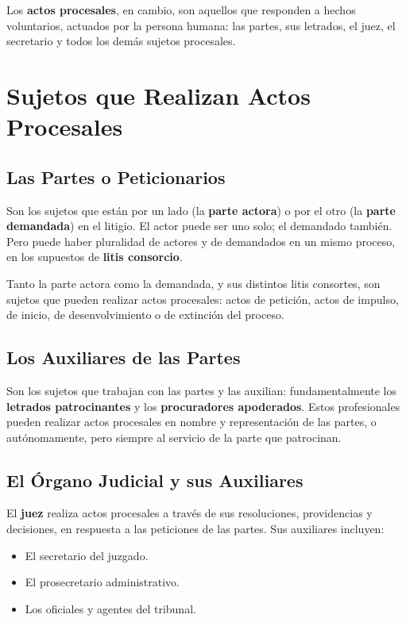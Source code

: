 \documentclass[12pt,oneside]{book}
\begin{document}
Los \textbf{actos procesales}, en cambio, son aquellos que responden a hechos voluntarios, actuados por la persona humana: las partes, sus letrados, el juez, el secretario y todos los demás sujetos procesales.

\section{Sujetos que Realizan Actos Procesales}

\subsection{Las Partes o Peticionarios}

Son los sujetos que están por un lado (la \textbf{parte actora}) o por el otro (la \textbf{parte demandada}) en el litigio. El actor puede ser uno solo; el demandado también. Pero puede haber pluralidad de actores y de demandados en un mismo proceso, en los supuestos de \textbf{litis consorcio}.

Tanto la parte actora como la demandada, y sus distintos litis consortes, son sujetos que pueden realizar actos procesales: actos de petición, actos de impulso, de inicio, de desenvolvimiento o de extinción del proceso.

\subsection{Los Auxiliares de las Partes}

Son los sujetos que trabajan con las partes y las auxilian: fundamentalmente los \textbf{letrados patrocinantes} y los \textbf{procuradores apoderados}. Estos profesionales pueden realizar actos procesales en nombre y representación de las partes, o autónomamente, pero siempre al servicio de la parte que patrocinan.

\subsection{El Órgano Judicial y sus Auxiliares}

El \textbf{juez} realiza actos procesales a través de sus resoluciones, providencias y decisiones, en respuesta a las peticiones de las partes. Sus auxiliares incluyen:

\begin{itemize}
    \item El secretario del juzgado.
    \item El prosecretario administrativo.
    \item Los oficiales y agentes del tribunal.
\end{itemize}
\end{document}
